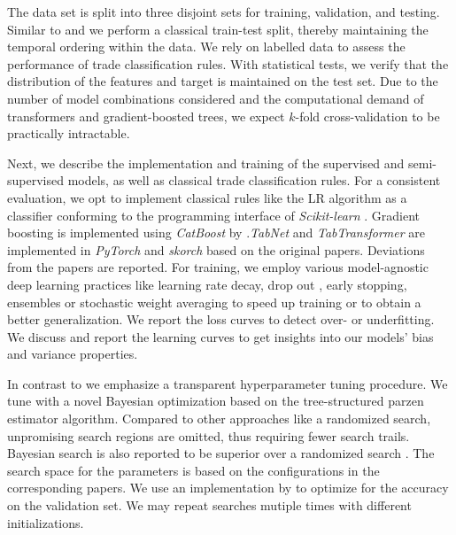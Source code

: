 The data set is split into three disjoint sets for training, validation, and testing. Similar to \textcite{ellisAccuracyTradeClassification2000} and \textcite{ronenMachineLearningTrade2022} we perform a classical train-test split, thereby maintaining the temporal ordering within the data. We rely on labelled data to assess the performance of trade classification rules. With statistical tests, we verify that the distribution of the features and target is maintained on the test set. Due to the number of model combinations considered and the computational demand of transformers and gradient-boosted trees, we expect $k$-fold cross-validation to be practically intractable.

Next, we describe the implementation and training of the supervised and semi-supervised models, as well as classical trade classification rules. 
For a consistent evaluation, we opt to implement classical rules like the LR algorithm as a classifier conforming to the programming interface of \textit{Scikit-learn} \autocite{pedregosaScikitlearnMachineLearning2018}.
Gradient boosting is implemented using \textit{CatBoost} by \textcite{prokhorenkovaCatBoostUnbiasedBoosting2018}.\textit{TabNet} and \textit{TabTransformer} are implemented in \textit{PyTorch} \autocite{paszkePyTorchImperativeStyle2019} and \textit{skorch} based on the original papers. Deviations from the papers are reported.
For training, we employ various model-agnostic deep learning practices like learning rate decay, drop out \autocite{hintonImprovingNeuralNetworks2012}, early stopping, ensembles \autocite{huangSnapshotEnsemblesTrain2017} or stochastic weight averaging \autocite{izmailovAveragingWeightsLeads2019} to speed up training or to obtain a better generalization. We report the loss curves to detect over- or underfitting. We discuss and report the learning curves to get insights into our models' bias and variance properties.  

In contrast to \textcite{ronenMachineLearningTrade2022} we emphasize a transparent hyperparameter tuning procedure. We tune with a novel Bayesian optimization based on the tree-structured parzen estimator algorithm. Compared to other approaches like a randomized search, unpromising search regions are omitted, thus requiring fewer search trails. Bayesian search is also reported to be superior over a randomized search \autocite{turnerBayesianOptimizationSuperior2021}. The search space for the parameters is based on the configurations in the corresponding papers. We use an implementation by \textcite{akibaOptunaNextgenerationHyperparameter2019} to optimize for the accuracy on the validation set. We may repeat searches mutiple times with different initializations.

